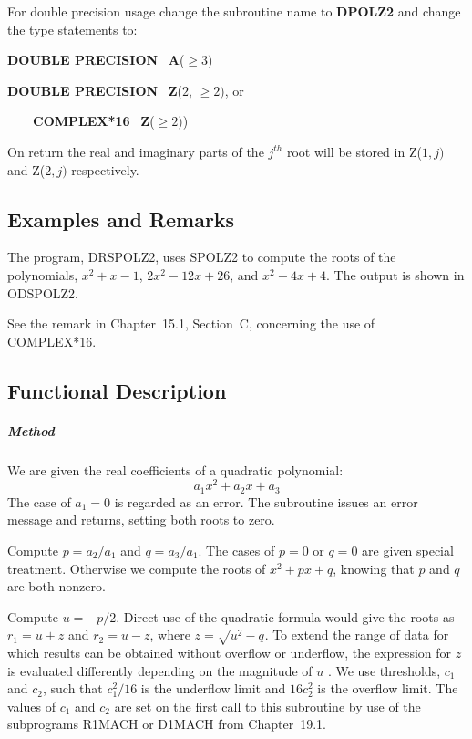 \documentclass[twoside]{MATH77}
\begin{document}
For double precision usage change the subroutine name to {\bf DPOLZ2} and
change the type statements to:

{\bf DOUBLE PRECISION} \ {\bf A}($\geq 3)$

{\bf DOUBLE PRECISION} \ {\bf Z}($2$, $\geq 2)$, or

{~~~~\bf COMPLEX*16} \ {\bf Z}($\geq 2)$)

On return the real and imaginary parts of the $j^{th}$ root will be stored
in Z($1,j)$ and Z($2,j)$ respectively.

\subsection{Examples and Remarks}

The program, DRSPOLZ2, uses SPOLZ2 to compute the roots of the polynomials, $%
x^2+x-1$, $2x^2-12x+26$, and $x^2-4x+4$. The output is shown in ODSPOLZ2.

See the remark in Chapter~15.1, Section~C, concerning the use of COMPLEX*16.

\subsection{Functional Description}

\subparagraph{Method}

We are given the real coefficients of a quadratic polynomial:%
\begin{equation*}
a_1x^2+a_2x+a_3
\end{equation*}
The case of $a_1=0$ is regarded as an error. The subroutine issues an error
message and returns, setting both roots to zero.

Compute $p = a_2/a_1$ and $q = a_3/a_1$. The cases of $p = 0$ or $q = 0$ are
given special treatment. Otherwise we compute the roots of $x^2 + px + q$,
knowing that $p$ and $q$ are both nonzero.

Compute $u=-p/2$. Direct use of the quadratic formula would give the roots
as $r_1=u+z$ and $r_2=u-z$, where $z= \sqrt{u^2-q}$. To extend the range of
data for which results can be obtained without overflow or underflow, the
expression for $z$ is evaluated differently depending on the magnitude of $u$%
. We use thresholds, $c_1$ and $c_2$, such that $c_1^2/16$ is the underflow
limit and $16c_2^2$ is the overflow limit. The values of $c_1$ and $c_2$ are
set on the first call to this subroutine by use of the subprograms R1MACH or
D1MACH from Chapter~19.1.
\end{document}
